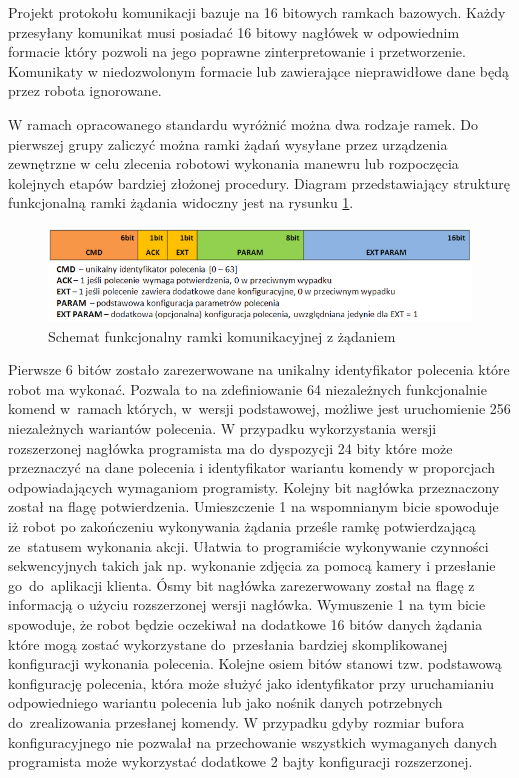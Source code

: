 Projekt protokołu komunikacji bazuje na 16 bitowych ramkach bazowych. Każdy przesyłany
komunikat musi posiadać 16 bitowy nagłówek w odpowiednim formacie który pozwoli
na jego poprawne zinterpretowanie i przetworzenie. Komunikaty w niedozwolonym formacie
lub zawierające nieprawidłowe dane będą przez robota ignorowane.

W ramach opracowanego standardu wyróżnić można dwa rodzaje ramek. Do pierwszej grupy
zaliczyć można ramki żądań wysyłane przez urządzenia zewnętrzne w celu zlecenia
robotowi wykonania manewru lub rozpoczęcia kolejnych etapów bardziej złożonej
procedury. Diagram przedstawiający strukturę funkcjonalną ramki żądania widoczny
jest na rysunku \ref{fig:RfcommReqFrame}.

\begin{figure}[h!] 
 \centering
 \includegraphics[width=\textwidth]{../images/ch05/req_schema2.png}
 \caption{Schemat funkcjonalny ramki komunikacyjnej z żądaniem}
 \label{fig:RfcommReqFrame}
\end{figure}

Pierwsze 6 bitów zostało zarezerwowane na unikalny identyfikator polecenia które
robot ma wykonać. Pozwala to na zdefiniowanie 64 niezależnych funkcjonalnie
komend w~ramach których, w~wersji podstawowej, możliwe jest uruchomienie 256
niezależnych wariantów polecenia. W przypadku wykorzystania wersji rozszerzonej
nagłówka programista ma do dyspozycji 24 bity które może przeznaczyć na dane
polecenia i identyfikator wariantu komendy w proporcjach odpowiadających
wymaganiom programisty. Kolejny bit nagłówka przeznaczony został na flagę potwierdzenia.
Umieszczenie 1 na wspomnianym bicie spowoduje iż robot po zakończeniu
wykonywania żądania prześle ramkę potwierdzającą ze~statusem wykonania akcji.
Ułatwia to programiście wykonywanie czynności sekwencyjnych takich jak np. wykonanie
zdjęcia za pomocą kamery i przesłanie go~do~aplikacji klienta. Ósmy bit nagłówka
zarezerwowany został na flagę z informacją o użyciu rozszerzonej wersji
nagłówka. Wymuszenie 1 na tym bicie spowoduje, że robot będzie oczekiwał na
dodatkowe 16 bitów danych żądania które mogą zostać wykorzystane do~przesłania
bardziej skomplikowanej konfiguracji wykonania polecenia. Kolejne osiem bitów
stanowi tzw. podstawową konfigurację polecenia, która może służyć jako
identyfikator przy uruchamianiu odpowiedniego wariantu polecenia lub jako nośnik
danych potrzebnych do~zrealizowania przesłanej komendy. W przypadku gdyby
rozmiar bufora konfiguracyjnego nie pozwalał na przechowanie wszystkich
wymaganych danych programista może wykorzystać dodatkowe 2 bajty konfiguracji
rozszerzonej.

